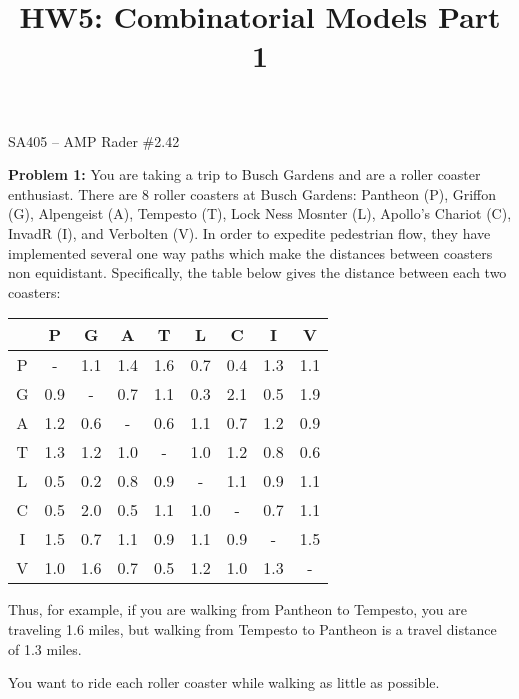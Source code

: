 \documentclass[11pt]{article}
\makeatletter
\theoremstyle{definition}
\renewcommand{\maketitle}{
  \noindent SA405 -- AMP \hfill Rader \#2.42 \\

  \begin{center}\Large{\textbf{\@title}}\end{center}
}
\makeatother
\begin{document}
  
\title{HW5: Combinatorial Models Part 1}


\maketitle


\textbf{Problem 1:} You are taking a trip to Busch Gardens and are a roller coaster enthusiast. There are 8 roller coasters at Busch Gardens: Pantheon (P), Griffon (G), Alpengeist (A), Tempesto (T), Lock Ness Mosnter (L), Apollo's Chariot (C), InvadR (I), and Verbolten (V). In order to expedite pedestrian flow, they have implemented several one way paths which make the distances between coasters non equidistant. Specifically, the table below gives the distance between each two coasters:

\begin{center}
\begin{tabular}{ccccccccc} 
  & P   & G   & A   & T   & L   & C   & I    & V  \\\hline
P & -   & 1.1 & 1.4 & 1.6 & 0.7 & 0.4 & 1.3  & 1.1 \\
G & 0.9 & -   & 0.7 & 1.1 & 0.3 & 2.1 & 0.5 & 1.9 \\
A & 1.2 & 0.6 & -   & 0.6 & 1.1 & 0.7 & 1.2 & 0.9 \\
T & 1.3 & 1.2 & 1.0 & -   & 1.0 & 1.2 & 0.8 & 0.6 \\
L & 0.5 & 0.2 & 0.8 & 0.9 & -   & 1.1 & 0.9 & 1.1 \\
C & 0.5 & 2.0 & 0.5 & 1.1 & 1.0 & -   & 0.7 & 1.1 \\
I & 1.5 & 0.7 & 1.1 & 0.9 & 1.1 & 0.9 & -   & 1.5 \\
V & 1.0 & 1.6 & 0.7 & 0.5 & 1.2 & 1.0 & 1.3 & - \\
\end{tabular}
\end{center}

Thus, for example, if you are walking from Pantheon to Tempesto, you are traveling 1.6 miles, but walking from Tempesto to Pantheon is a travel distance of 1.3 miles.

You want to ride each roller coaster while walking as little as possible.
\end{document}
